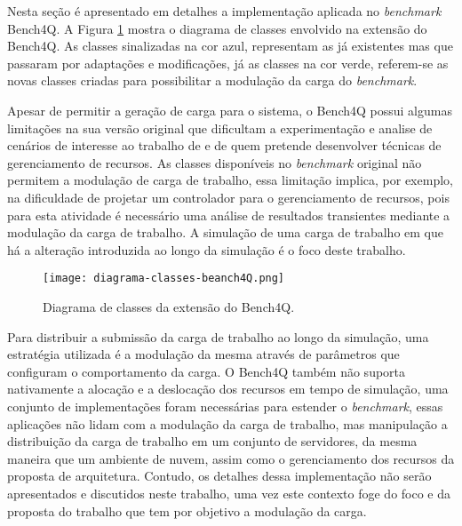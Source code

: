 Nesta seção é apresentado em detalhes a implementação aplicada no \textit{benchmark} Bench4Q. A Figura \ref{fig:diagrama-classes} mostra o diagrama de classes envolvido na extensão do Bench4Q. As classes sinalizadas na cor azul, representam as já existentes mas que passaram por adaptações e modificações, já as classes na cor verde, referem-se as novas classes criadas para possibilitar a modulação da carga do \textit{benchmark}.

Apesar de permitir a geração de carga para o sistema, o Bench4Q possui algumas limitações na sua versão original que dificultam a experimentação e analise de cenários de interesse ao trabalho de  e  de quem pretende desenvolver técnicas de gerenciamento de recursos.
As classes disponíveis no \textit{benchmark} original não permitem a modulação de carga de trabalho, essa limitação implica, por exemplo, na dificuldade de projetar um controlador para o gerenciamento de recursos, pois para esta atividade é necessário uma análise de resultados transientes mediante a modulação da carga de trabalho. A simulação de uma carga de trabalho em que há a alteração introduzida ao longo da simulação é o foco deste trabalho.

\begin{figure}[!htb]
	\centering
	\texttt{[image: diagrama-classes-beanch4Q.png]}	
	\caption{Diagrama de classes da extensão do Bench4Q.}
	\label{fig:diagrama-classes}
	\fautor
\end{figure}

Para distribuir a submissão da carga de trabalho ao longo da simulação, uma estratégia utilizada é a modulação da mesma através de parâmetros que configuram o comportamento da carga. O Bench4Q também não suporta nativamente a alocação e a deslocação dos recursos em tempo de simulação, uma conjunto de implementações foram necessárias para estender o \textit{benchmark}, essas aplicações não lidam com a modulação da carga de trabalho, mas manipulação a distribuição da carga de trabalho em um conjunto de servidores, da mesma maneira que um ambiente de nuvem, assim como o gerenciamento dos recursos da proposta de arquitetura. Contudo, os detalhes dessa implementação não serão apresentados e discutidos neste trabalho, uma vez este contexto foge do foco e da proposta do trabalho que tem por objetivo a modulação da carga.




